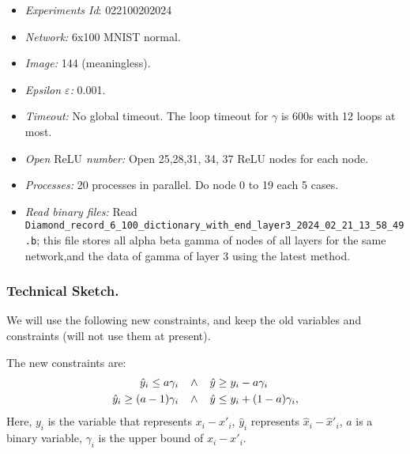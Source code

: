 \documentclass{llncs}
\newcommand{\ReLU}{\mathrm{ReLU}}
\begin{document}
\begin{itemize}
	\item\emph{Experiments Id}: 022100202024
	
	\item\emph{Network:} 6x100 MNIST normal. 
	
	\item\emph{Image:} 144 (meaningless).
	
	\item\emph{Epsilon $\varepsilon$:} 0.001.
	
	\item\emph{Timeout:} No global timeout. The loop timeout for $\gamma$ is 600s with 12 loops at most.
	
	\item\emph{Open $\ReLU$ number:} Open 25,28,31, 34, 37 ReLU nodes for each node.
	
	\item\emph{Processes:} 20 processes in parallel. Do node 0 to 19 each 5 cases.
	
	\item\emph{Read binary files:} Read \verb*|Diamond_record_6_100_dictionary_with_end_layer3_2024_02_21_13_58_49.b|; this file stores all alpha beta gamma of nodes of all layers for the same network,and the data of gamma of layer 3 using the latest method. 
\end{itemize}


\subsubsection*{Technical Sketch.}

We will use the following new constraints, and keep the old variables and constraints (will not use them at present).

The new constraints are: \begin{align*}
	\hat{y}_i \leq a \gamma_i \hspace*{2ex} &\wedge \hspace*{2ex}\hat{y} \geq y_i - a \gamma_i\\
	\hat{y}_i \geq (a-1) \gamma_i  \hspace*{2ex} &\wedge \hspace*{2ex} \hat{y} \leq y_i + (1-a) \gamma_i,
\end{align*} Here, $y_i$ is the variable that represents $x_i-x'_i$, $\hat{y}_i$ represents $\hat{x}_i-\hat{x}'_i$, $a$ is a binary variable, $\gamma_i$ is the upper bound of $x_i-x'_i$.
\end{document}
